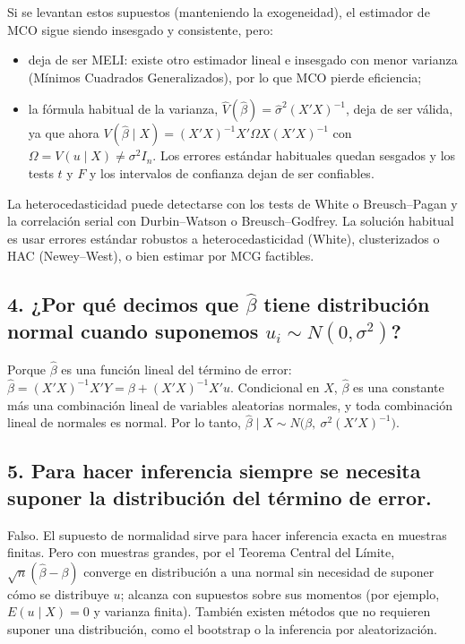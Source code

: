 \documentclass[11pt,a4paper]{article}
\begin{document}
Si se levantan estos supuestos (manteniendo la exogeneidad), el estimador de MCO sigue siendo insesgado y consistente, pero:
\begin{itemize}
  \item deja de ser MELI: existe otro estimador lineal e insesgado con menor varianza (Mínimos Cuadrados Generalizados), por lo que MCO pierde eficiencia;
  \item la fórmula habitual de la varianza, $\widehat{V}(\hat\beta)=\hat\sigma^2(X'X)^{-1}$, deja de ser válida, ya que ahora $V(\hat\beta\mid X)=(X'X)^{-1}X'\Omega X(X'X)^{-1}$ con $\Omega=V(u\mid X)\neq\sigma^2 I_n$. Los errores estándar habituales quedan sesgados y los tests $t$ y $F$ y los intervalos de confianza dejan de ser confiables.
\end{itemize}
La heterocedasticidad puede detectarse con los tests de White o Breusch--Pagan y la correlación serial con Durbin--Watson o Breusch--Godfrey. La solución habitual es usar errores estándar robustos a heterocedasticidad (White), clusterizados o HAC (Newey--West), o bien estimar por MCG factibles.

\subsection*{4. ¿Por qué decimos que $\hat\beta$ tiene distribución normal cuando suponemos $u_i\sim N(0,\sigma^2)$?}

Porque $\hat\beta$ es una función lineal del término de error: $\hat\beta=(X'X)^{-1}X'Y=\beta+(X'X)^{-1}X'u$. Condicional en $X$, $\hat\beta$ es una constante más una combinación lineal de variables aleatorias normales, y toda combinación lineal de normales es normal. Por lo tanto, $\hat\beta\mid X\sim N\big(\beta,\ \sigma^2(X'X)^{-1}\big)$.

\subsection*{5. Para hacer inferencia siempre se necesita suponer la distribución del término de error.}

Falso. El supuesto de normalidad sirve para hacer inferencia exacta en muestras finitas. Pero con muestras grandes, por el Teorema Central del Límite, $\sqrt{n}(\hat\beta-\beta)$ converge en distribución a una normal sin necesidad de suponer cómo se distribuye $u$; alcanza con supuestos sobre sus momentos (por ejemplo, $E(u\mid X)=0$ y varianza finita). También existen métodos que no requieren suponer una distribución, como el bootstrap o la inferencia por aleatorización.
\end{document}

